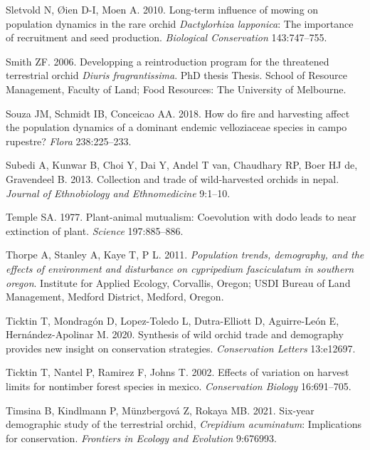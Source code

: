 \documentclass[
  12pt,
  letterpaper,
]{book}
\newlength{\cslhangindent}
\newenvironment{CSLReferences}[2] %
 {\begin{list}{}{%
  \setlength{\itemindent}{0pt}
  \setlength{\leftmargin}{0pt}
  \setlength{\parsep}{0pt}
  \ifodd #1
   \setlength{\leftmargin}{\cslhangindent}
   \setlength{\itemindent}{-1\cslhangindent}
  \fi
  \setlength{\itemsep}{#2\baselineskip}}}
 {\end{list}}
\begin{document}
\begin{CSLReferences}{1}{0}
Sletvold N, Øien D-I, Moen A. 2010. Long-term influence of mowing on
population dynamics in the rare orchid \emph{{D}actylorhiza
{l}apponica}: The importance of recruitment and seed production.
\emph{Biological Conservation} 143:747--755.

Smith ZF. 2006. Developping a reintroduction program for the threatened
terrestrial orchid \emph{{D}iuris fragrantissima}. PhD thesis Thesis.
School of Resource Management, Faculty of Land; Food Resources: The
University of Melbourne.

Souza JM, Schmidt IB, Conceicao AA. 2018. How do fire and harvesting
affect the population dynamics of a dominant endemic velloziaceae
species in campo rupestre? \emph{Flora} 238:225--233.

Subedi A, Kunwar B, Choi Y, Dai Y, Andel T van, Chaudhary RP, Boer HJ
de, Gravendeel B. 2013. Collection and trade of wild-harvested orchids
in nepal. \emph{Journal of Ethnobiology and Ethnomedicine} 9:1--10.

Temple SA. 1977. Plant-animal mutualism: Coevolution with dodo leads to
near extinction of plant. \emph{Science} 197:885--886.

Thorpe A, Stanley A, Kaye T, P L. 2011. \emph{Population trends,
demography, and the effects of environment and disturbance on
\emph{cypripedium {f}asciculatum} in southern oregon}. Institute for
Applied Ecology, Corvallis, Oregon; USDI Bureau of Land Management,
Medford District, Medford, Oregon.

Ticktin T, Mondragón D, Lopez-Toledo L, Dutra-Elliott D, Aguirre-León E,
Hernández-Apolinar M. 2020. Synthesis of wild orchid trade and
demography provides new insight on conservation strategies.
\emph{Conservation Letters} 13:e12697.

Ticktin T, Nantel P, Ramirez F, Johns T. 2002. Effects of variation on
harvest limits for nontimber forest species in mexico.
\emph{Conservation Biology} 16:691--705.

Timsina B, Kindlmann P, Münzbergová Z, Rokaya MB. 2021. Six-year
demographic study of the terrestrial orchid, \emph{{C}repidium
{a}cuminatum}: Implications for conservation. \emph{Frontiers in Ecology
and Evolution} 9:676993.


\end{CSLReferences}
\end{document}
